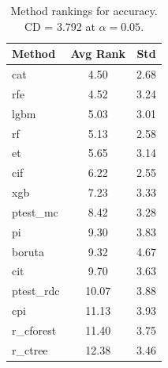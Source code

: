 \begin{table}[h]
\centering
\caption{Method rankings for accuracy. CD = 3.792 at $\alpha=0.05$.}
\label{tab:ranks_accuracy}
\begin{tabular}{lcc}
\toprule
Method & Avg Rank & Std \\
\midrule
cat & 4.50 & 2.68 \\
rfe & 4.52 & 3.24 \\
lgbm & 5.03 & 3.01 \\
rf & 5.13 & 2.58 \\
et & 5.65 & 3.14 \\
cif & 6.22 & 2.55 \\
xgb & 7.23 & 3.33 \\
ptest_mc & 8.42 & 3.28 \\
pi & 9.30 & 3.83 \\
boruta & 9.32 & 4.67 \\
cit & 9.70 & 3.63 \\
ptest_rdc & 10.07 & 3.88 \\
cpi & 11.13 & 3.93 \\
r_cforest & 11.40 & 3.75 \\
r_ctree & 12.38 & 3.46 \\
\bottomrule
\end{tabular}
\end{table}